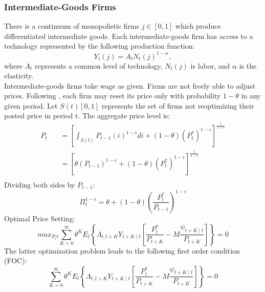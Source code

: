 \documentclass[11pt, a4paper, leqno]{article}
\begin{document}
\subsubsection{Intermediate-Goods Firms}
There is a continuum of monopolistic firms $j \in [0,1]$ which produce differentiated intermediate goods. Each intermediate-goods firm has access to a technology represented by the following production function:
\begin{equation}
		Y_{t}(j) = A_{t}N_{t}(j)^{1- \alpha},
\end{equation}
where $A_{t}$ represents a common level of technology, $N_{t}(j)$ is labor, and $\alpha$ is the elasticity.\\
Intermediate-goods firms take wage as given. Firms are not freely able to adjust prices. Following \citet{calvo1983staggered}, each firm may reset its price only with probability $1- \theta$ in any given period.
Let $S(t) [0,1]$ represents the set of firms not reoptimizing their posted price in period t. The aggregate price level is:
\begin{equation}
	\begin{aligned}
	P_{t} \quad & = \left[ \int_{S(t)}^{} P_{t-1}(i)^{1- \epsilon} di + (1- \theta) \left( P^{*}_{t} \right)^{1- \epsilon} \right]^{\frac{1}{1- \epsilon}}\\
		\quad & = \left[ \theta \left( P_{t-1} \right)^{1- \epsilon} + \left(1- \theta \right) \left( P^{*}_{t} \right)^{1- \epsilon} \right]^{\frac{1}{1- \epsilon}}\\
	\end{aligned}
\end{equation}
Dividing both sides by $P_{t-1}$:
\begin{equation}
	\Pi_{t}^{1- \epsilon} = \theta + (1- \theta) \left( \frac{P^{*}_{t}}{P_{t-1}} \right)^{1- \epsilon}
\end{equation}
Optimal Price Setting:
\begin{equation}
	max_{P_it}\sum_{K=0}^{\infty} \theta^{K} E_{t} \left\{ \Lambda_{t,t+K} Y_{t+K \mid t} \left[ \frac{P_{t}^{*}}{P_{t+K}}- M \frac{\psi_{t+K \mid t}}{P_{t+K}} \right] \right\} = 0
\end{equation}
The latter optimization problem leads to the following first order condition (FOC):
\begin{equation}
	\sum_{K=0}^{\infty} \theta^{K} E_{t} \left\{ \Lambda_{t,t+K} Y_{t+K \mid t} \left[ \frac{P_{t}^{*}}{P_{t+K}}- M \frac{\psi_{t+K \mid t}}{P_{t+K}} \right] \right\} = 0
\end{equation}
\end{document}
